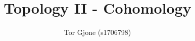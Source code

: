 \documentclass[a4paper,11pt,english]{article}
\title{\textbf{Topology II - Cohomology}}
\author{Tor Gjone (s1706798)}
\begin{document}
\mmaketitle
\end{document}
